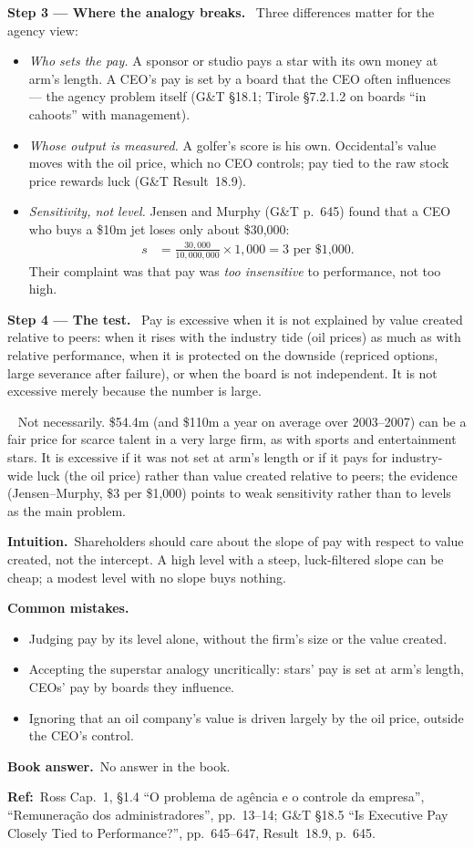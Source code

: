 \documentclass[11pt,a4paper]{article}
\newcommand{\step}[2]{\par\medskip\noindent\textbf{Step #1 --- #2.}~}
\newcommand{\intuition}{\par\medskip\noindent\textbf{Intuition.}~}
\newcommand{\bookans}{\par\medskip\noindent\textbf{Book answer.}~}
\newcommand{\refbib}{\par\smallskip\noindent\textbf{Ref:}~}
\newcommand{\answer}[1]{\par\smallskip\noindent\fbox{\textbf{Answer #1.}}~}
\newcommand{\pitfalls}{\par\medskip\noindent\textbf{Common mistakes.}}
\newcommand{\pt}{\foreignlanguage{brazilian}}
\begin{document}
\step{3}{Where the analogy breaks} Three differences matter for the agency view:
\begin{itemize}
  \item \emph{Who sets the pay.} A sponsor or studio pays a star with its own money at arm's length. A CEO's pay is set by a board that the CEO often influences --- the agency problem itself (G\&T \S18.1; Tirole \S7.2.1.2 on boards ``in cahoots'' with management).
  \item \emph{Whose output is measured.} A golfer's score is his own. Occidental's value moves with the oil price, which no CEO controls; pay tied to the raw stock price rewards luck (G\&T Result~18.9).
  \item \emph{Sensitivity, not level.} Jensen and Murphy (G\&T p.~645) found that a CEO who buys a \$10m jet loses only about \$30{,}000:
  \begin{align}
    s &= \frac{30{,}000}{10{,}000{,}000}\times 1{,}000 = 3 \text{ per \$1{,}000}. \label{r8be1-jm}
  \end{align}
  Their complaint was that pay was \emph{too insensitive} to performance, not too high.
\end{itemize}

\step{4}{The test} Pay is excessive when it is not explained by value created relative to peers: when it rises with the industry tide (oil prices) as much as with relative performance, when it is protected on the downside (repriced options, large severance after failure), or when the board is not independent. It is not excessive merely because the number is large.

\answer{} Not necessarily. \$54.4m (and \$110m a year on average over 2003--2007) can be a fair price for scarce talent in a very large firm, as with sports and entertainment stars. It is excessive if it was not set at arm's length or if it pays for industry-wide luck (the oil price) rather than value created relative to peers; the evidence (Jensen--Murphy, \$3 per \$1{,}000) points to weak sensitivity rather than to levels as the main problem.

\intuition Shareholders should care about the slope of pay with respect to value created, not the intercept. A high level with a steep, luck-filtered slope can be cheap; a modest level with no slope buys nothing.

\pitfalls
\begin{itemize}
  \item Judging pay by its level alone, without the firm's size or the value created.
  \item Accepting the superstar analogy uncritically: stars' pay is set at arm's length, CEOs' pay by boards they influence.
  \item Ignoring that an oil company's value is driven largely by the oil price, outside the CEO's control.
\end{itemize}
\bookans No answer in the book.
\refbib{Ross Cap.~1, \S1.4 ``\pt{O problema de ag\^encia e o controle da empresa}'', ``\pt{Remunera\c{c}\~ao dos administradores}'', pp.~13--14; G\&T \S18.5 ``Is Executive Pay Closely Tied to Performance?'', pp.~645--647, Result~18.9, p.~645.}
\end{document}
